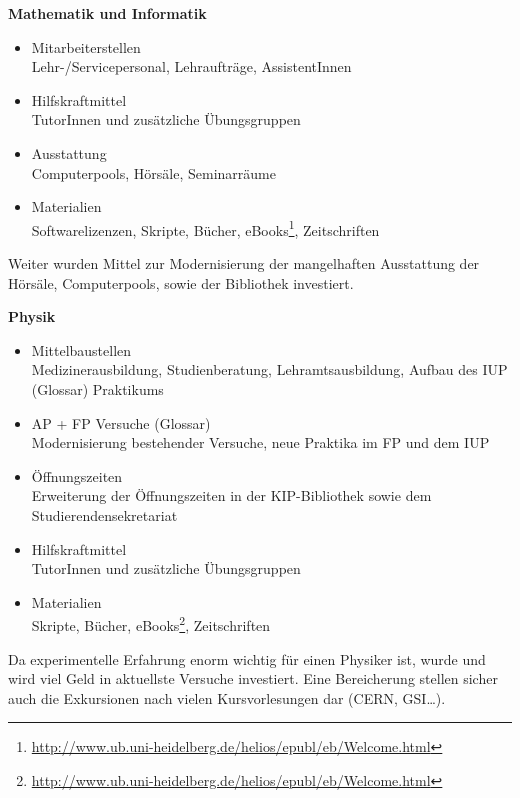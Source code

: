 \vspace{5mm}
\textbf{Mathematik und Informatik}
\begin{itemize}
 \item {Mitarbeiterstellen}\\Lehr-/Servicepersonal, Lehraufträge, AssistentInnen
\item {Hilfskraftmittel}\\ TutorInnen und zusätzliche Übungsgruppen
\item {Ausstattung}\\ Computerpools, Hörsäle, Seminarräume
\item {Materialien}\\ Softwarelizenzen, Skripte, Bücher, eBooks\footnote{\url{http://www.ub.uni-heidelberg.de/helios/epubl/eb/Welcome.html}}, Zeitschriften
\end{itemize}

Weiter wurden Mittel zur Modernisierung der mangelhaften Ausstattung der Hörsäle,
Computerpools, sowie der Bibliothek investiert.

\vspace{5mm}
\textbf{Physik}
\begin{itemize}
\item {Mittelbaustellen}\\Medizinerausbildung, Studienberatung, Lehramtsausbildung, Aufbau des IUP (Glossar) Praktikums
\item {AP + FP Versuche (Glossar)}\\Modernisierung bestehender Versuche, neue
Praktika im FP und dem IUP
\item {Öffnungszeiten}\\Erweiterung der Öffnungszeiten in der \gls{KIP}-Bibliothek sowie dem Studierendensekretariat
\item {Hilfskraftmittel}\\ TutorInnen und zusätzliche Übungsgruppen
\item {Materialien}\\Skripte, Bücher, eBooks\footnote{\url{http://www.ub.uni-heidelberg.de/helios/epubl/eb/Welcome.html}}, Zeitschriften
\end{itemize}

Da experimentelle Erfahrung enorm wichtig für einen Physiker ist, wurde und wird
viel Geld in aktuellste Versuche investiert. Eine Bereicherung stellen sicher auch
die Exkursionen nach vielen Kursvorlesungen dar (CERN, GSI\dots).



